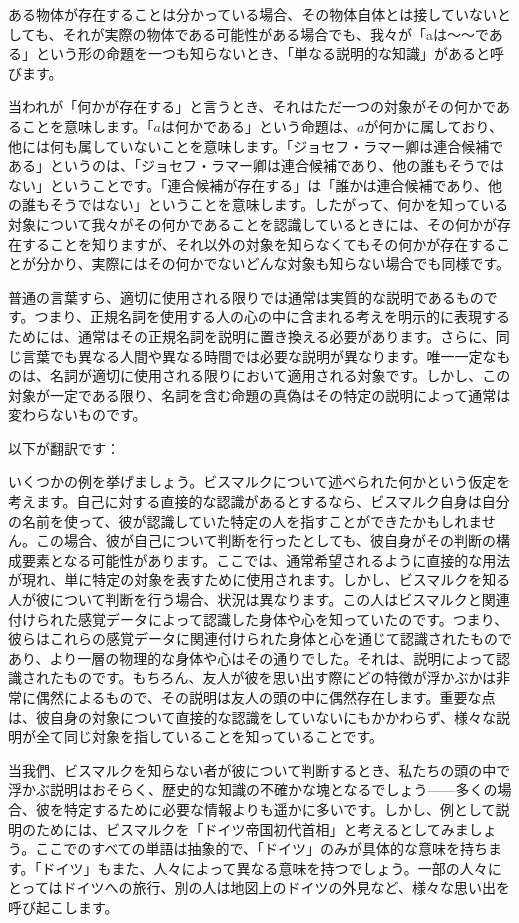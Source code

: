 \documentclass[a4paper,11pt,openany]{ltjsbook}
\begin{document}
ある物体が存在することは分かっている場合、その物体自体とは接していないとしても、それが実際の物体である可能性がある場合でも、我々が「aは～～である」という形の命題を一つも知らないとき、「単なる説明的な知識」があると呼びます。

当われが「何かが存在する」と言うとき、それはただ一つの対象がその何かであることを意味します。「$a$は何かである」という命題は、$a$が何かに属しており、他には何も属していないことを意味します。「ジョセフ・ラマー卿は連合候補である」というのは、「ジョセフ・ラマー卿は連合候補であり、他の誰もそうではない」ということです。「連合候補が存在する」は「誰かは連合候補であり、他の誰もそうではない」ということを意味します。したがって、何かを知っている対象について我々がその何かであることを認識しているときには、その何かが存在することを知りますが、それ以外の対象を知らなくてもその何かが存在することが分かり、実際にはその何かでないどんな対象も知らない場合でも同様です。

普通の言葉すら、適切に使用される限りでは通常は実質的な説明であるものです。つまり、正規名詞を使用する人の心の中に含まれる考えを明示的に表現するためには、通常はその正規名詞を説明に置き換える必要があります。さらに、同じ言葉でも異なる人間や異なる時間では必要な説明が異なります。唯一一定なものは、名詞が適切に使用される限りにおいて適用される対象です。しかし、この対象が一定である限り、名詞を含む命題の真偽はその特定の説明によって通常は変わらないものです。

以下が翻訳です：

いくつかの例を挙げましょう。ビスマルクについて述べられた何かという仮定を考えます。自己に対する直接的な認識があるとするなら、ビスマルク自身は自分の名前を使って、彼が認識していた特定の人を指すことができたかもしれません。この場合、彼が自己について判断を行ったとしても、彼自身がその判断の構成要素となる可能性があります。ここでは、通常希望されるように直接的な用法が現れ、単に特定の対象を表すために使用されます。しかし、ビスマルクを知る人が彼について判断を行う場合、状況は異なります。この人はビスマルクと関連付けられた感覚データによって認識した身体や心を知っていたのです。つまり、彼らはこれらの感覚データに関連付けられた身体と心を通じて認識されたものであり、より一層の物理的な身体や心はその通りでした。それは、説明によって認識されたものです。もちろん、友人が彼を思い出す際にどの特徴が浮かぶかは非常に偶然によるもので、その説明は友人の頭の中に偶然存在します。重要な点は、彼自身の対象について直接的な認識をしていないにもかかわらず、様々な説明が全て同じ対象を指していることを知っていることです。

当我們、ビスマルクを知らない者が彼について判断するとき、私たちの頭の中で浮かぶ説明はおそらく、歴史的な知識の不確かな塊となるでしょう——多くの場合、彼を特定するために必要な情報よりも遥かに多いです。しかし、例として説明のためには、ビスマルクを「ドイツ帝国初代首相」と考えるとしてみましょう。ここでのすべての単語は抽象的で、「ドイツ」のみが具体的な意味を持ちます。「ドイツ」もまた、人々によって異なる意味を持つでしょう。一部の人々にとってはドイツへの旅行、別の人は地図上のドイツの外見など、様々な思い出を呼び起こします。
\end{document}

